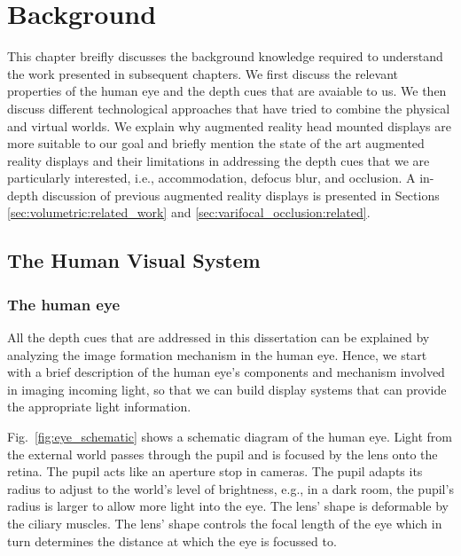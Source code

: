 \chapter{Background}
\label{chapter:background}

This chapter breifly discusses the background knowledge required to understand the work presented in subsequent chapters. 
We first discuss the relevant properties of the human eye and the depth cues that are avaiable to us. 
We then discuss different technological approaches that have tried to combine the physical and virtual worlds. 
We explain why augmented reality head mounted displays are more suitable to our goal and briefly mention the state of the art augmented reality displays and their limitations in addressing the depth cues that we are particularly interested, i.e., accommodation, defocus blur, and occlusion.
A in-depth discussion of previous augmented reality displays is presented in Sections \ref{sec:volumetric:related_work} and \ref{sec:varifocal_occlusion:related}.

\section{The Human Visual System}
\label{sec:background:hvs}
\subsection{The human eye}

All the depth cues that are addressed in this dissertation can be explained by analyzing the image formation mechanism in the human eye. 
Hence, we start with a brief description of the human eye's components and mechanism involved in imaging incoming light, so that we can build display systems that can provide the appropriate light information.



Fig.~\ref{fig:eye_schematic} shows a schematic diagram of the human eye. 
Light from the external world passes through the pupil and is focused by the lens onto the retina. 
The pupil acts like an aperture stop in cameras. 
The pupil adapts its radius to adjust to the world’s level of brightness, e.g., in a dark room, the pupil’s radius is larger to allow more light into the eye. 
The lens’ shape is deformable by the ciliary muscles. 
The lens’ shape controls the focal length of the eye which in turn determines the distance at which the eye is focussed to.

